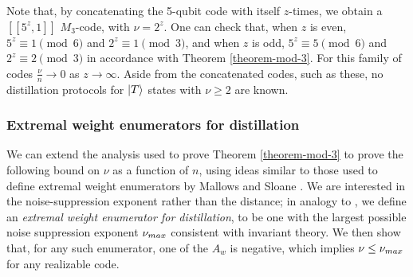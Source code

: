 \documentclass[11pt]{article}
\def\ket#1{\mathinner{|{#1}\rangle}}
\begin{document}
Note that, by concatenating the 5-qubit code with itself $z$-times, we obtain a $[[5^z,1]]$ $M_3$-code, with $\nu=2^z$. One can check that, when $z$ is even, $5^z \equiv 1 \pmod 6$ and $2^z \equiv 1 \pmod 3$, and when $z$ is odd, $5^z \equiv 5 \pmod 6$ and $2^z \equiv 2 \pmod 3$ in accordance with Theorem \ref{theorem-mod-3}. For this family of codes $\frac{\nu}{n} \to 0$ as $z \to \infty$. Aside from the concatenated codes, such as these, no distillation protocols for $\ket{T}$ states with $\nu \geq 2$ are known.

\subsubsection{Extremal weight enumerators for distillation} 
We can extend the analysis used to prove Theorem \ref{theorem-mod-3} to prove the following bound on $\nu$ as a function of $n$, using ideas similar to those used to define extremal weight enumerators by Mallows and Sloane  \cite{MALLOWS1973188}. We are interested in the noise-suppression exponent rather than the distance; in analogy to \cite{MALLOWS1973188}, we define an \textit{extremal weight enumerator for distillation}, to be one with the largest possible noise suppression exponent $\nu_{\rm max}$ consistent with invariant theory. We then show that, for any such enumerator, one of the $A_w$ is negative, which implies $\nu \leq \nu_{\rm max}$ for any realizable code.
\end{document}
